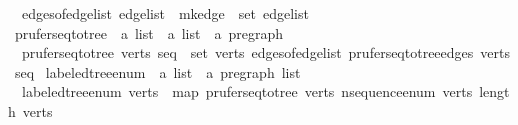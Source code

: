 \begin{isabellebody}
\ \ {\isachardoublequoteopen}edges{\isacharunderscore}{\kern0pt}of{\isacharunderscore}{\kern0pt}edge{\isacharunderscore}{\kern0pt}list\ edge{\isacharunderscore}{\kern0pt}list\ {\isasymequiv}\ mk{\isacharunderscore}{\kern0pt}edge\ {\isacharbackquote}{\kern0pt}\ set\ edge{\isacharunderscore}{\kern0pt}list{\isachardoublequoteclose}\isanewline
\isanewline
{}\isamarkupfalse%
\ prufer{\isacharunderscore}{\kern0pt}seq{\isacharunderscore}{\kern0pt}to{\isacharunderscore}{\kern0pt}tree\ {\isacharcolon}{\kern0pt}{\isacharcolon}{\kern0pt}\ {\isachardoublequoteopen}{\isacharprime}{\kern0pt}a\ list\ {\isasymRightarrow}\ {\isacharprime}{\kern0pt}a\ list\ {\isasymRightarrow}\ {\isacharprime}{\kern0pt}a\ pregraph{\isachardoublequoteclose}\ \isanewline
\ \ {\isachardoublequoteopen}prufer{\isacharunderscore}{\kern0pt}seq{\isacharunderscore}{\kern0pt}to{\isacharunderscore}{\kern0pt}tree\ verts\ seq\ {\isacharequal}{\kern0pt}\ {\isacharparenleft}{\kern0pt}set\ verts{\isacharcomma}{\kern0pt}\ edges{\isacharunderscore}{\kern0pt}of{\isacharunderscore}{\kern0pt}edge{\isacharunderscore}{\kern0pt}list\ {\isacharparenleft}{\kern0pt}prufer{\isacharunderscore}{\kern0pt}seq{\isacharunderscore}{\kern0pt}to{\isacharunderscore}{\kern0pt}tree{\isacharunderscore}{\kern0pt}edges\ verts\ seq{\isacharparenright}{\kern0pt}{\isacharparenright}{\kern0pt}{\isachardoublequoteclose}\isanewline
\isanewline
{}\isamarkupfalse%
\ labeled{\isacharunderscore}{\kern0pt}tree{\isacharunderscore}{\kern0pt}enum\ {\isacharcolon}{\kern0pt}{\isacharcolon}{\kern0pt}\ {\isachardoublequoteopen}{\isacharprime}{\kern0pt}a\ list\ {\isasymRightarrow}\ {\isacharprime}{\kern0pt}a\ pregraph\ list{\isachardoublequoteclose}\ \isanewline
\ \ {\isachardoublequoteopen}labeled{\isacharunderscore}{\kern0pt}tree{\isacharunderscore}{\kern0pt}enum\ verts\ {\isacharequal}{\kern0pt}\ map\ {\isacharparenleft}{\kern0pt}prufer{\isacharunderscore}{\kern0pt}seq{\isacharunderscore}{\kern0pt}to{\isacharunderscore}{\kern0pt}tree\ verts{\isacharparenright}{\kern0pt}\ {\isacharparenleft}{\kern0pt}n{\isacharunderscore}{\kern0pt}sequence{\isacharunderscore}{\kern0pt}enum\ verts\ {\isacharparenleft}{\kern0pt}length\ verts\ {\isacharminus}{\kern0pt}\ {}{\isacharparenright}{\kern0pt}{\isacharparenright}{\kern0pt}{\isachardoublequoteclose}%
\isadelimdocument
%
\endisadelimdocument
%
\isatagdocument
%
\isamarkuptrue%
%
\endisatagdocument
{\isafolddocument}%
%
\isadelimdocument
%
\endisadelimdocument
%
\begin{isamarkuptext}%

\end{isamarkuptext}
\end{isabellebody}
